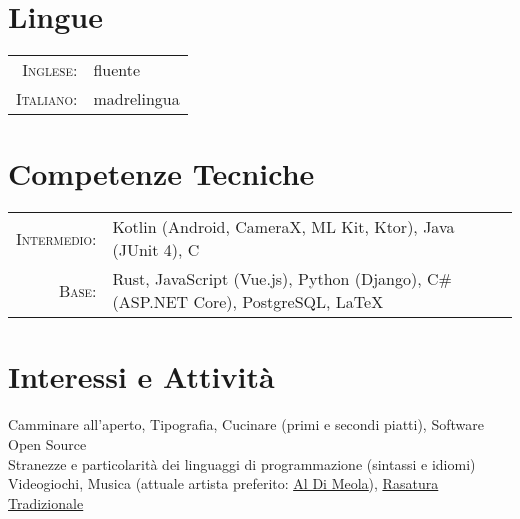 \documentclass[a4paper,10pt]{article} %
\begin{document}

\section{Lingue}

\begin{tabular}{rl}
\textsc{Inglese:} & fluente\\
\textsc{Italiano:} & madrelingua\\
\end{tabular}


\section{Competenze Tecniche}

\begin{tabular}{rl}
\textsc{Intermedio:} & Kotlin \footnotesize(Android, CameraX, ML Kit, Ktor)\normalsize, Java \footnotesize(JUnit 4)\normalsize, C\\
\textsc{Base:} & Rust, JavaScript \footnotesize(Vue.js)\normalsize, Python \footnotesize(Django)\normalsize, C\# \footnotesize(ASP.NET Core)\normalsize, PostgreSQL, {\sffamily\LaTeX}\setmainfont[SmallCapsFont=Fontin SmallCaps]{Fontin-Regular}\\

\end{tabular}


\section{Interessi e Attività}

Camminare all'aperto, Tipografia, Cucinare \footnotesize(primi e secondi piatti)\normalsize, Software Open Source\\
Stranezze e particolarità dei linguaggi di programmazione \footnotesize(sintassi e idiomi)\normalsize\\
Videogiochi, Musica \footnotesize(attuale artista preferito: \href{https://youtu.be/tsmThCBkBUo}{\underline{Al Di Meola}})\normalsize, \href{https://youtu.be/s0lyDViRbTY}{\underline{Rasatura Tradizionale}}

\end{document}
